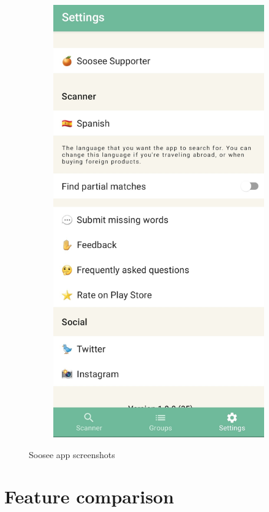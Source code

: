\begin{figure}[h]
\begin{subfigure}{0.3\textwidth}
        \includegraphics[width=0.9\linewidth]{Figures/soosee-3.jpg}
        \caption{}
        \label{fig:soosee-3}
    \end{subfigure}
    \caption{Soosee app screenshots}
    \label{fig:soosee-screenshot}
\end{figure}

\section{Feature comparison}

